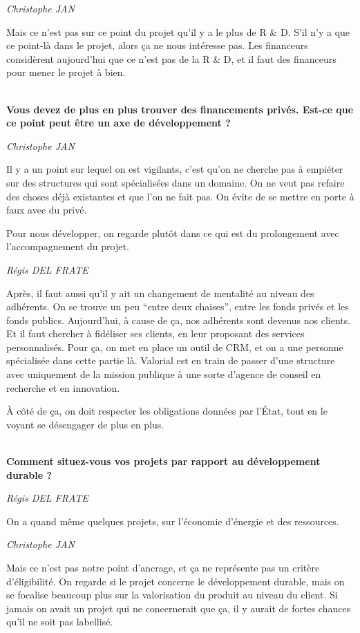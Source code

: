 \documentclass[a4paper,12pt]{report}
\begin{document}
	\emph{Christophe JAN}
	 
    Mais ce n’est pas sur ce point du projet qu’il y a le plus de R \& D. S’il n’y a que ce point-là dans le projet, alors ça ne nous intéresse pas. Les financeurs considèrent aujourd’hui que ce n’est pas de la R \& D, et il faut des financeurs pour mener le projet à bien.

	\textbf{\\Vous devez de plus en plus trouver des financements privés. Est-ce que ce point peut être un axe de développement ?}

	\emph{Christophe JAN}
	
    Il y a un point sur lequel on est vigilants, c’est qu’on ne cherche pas à empiéter sur des structures qui sont spécialisées dans un domaine. On ne veut pas refaire des choses déjà existantes et que l’on ne fait pas. On évite de se mettre en porte à faux avec du privé.
  
    Pour nous développer, on regarde plutôt dans ce qui est du prolongement avec l’accompagnement du projet.

	\emph{Régis DEL FRATE}
    
    Après, il faut aussi qu’il y ait un changement de mentalité au niveau des adhérents. On se trouve un peu “entre deux chaises”, entre les fonds privés et les fonds publics. Aujourd’hui, à cause de ça, nos adhérents sont devenus nos clients. Et il faut chercher à fidéliser ses clients, en leur proposant des services personnalisés. Pour ça, on met en place un outil de CRM, et on a une personne spécialisée dans cette partie là. Valorial est en train de passer d’une structure avec uniquement de la mission publique à une sorte d’agence de conseil en recherche et en innovation.
 
    À côté de ça, on doit respecter les obligations données par l’État, tout en le voyant se désengager de plus en plus. 

	\textbf{\\Comment situez-vous vos projets par rapport au développement durable ?}

	\emph{Régis DEL FRATE}
    
    On a quand même quelques projets, sur l’économie d’énergie et des ressources.

	\emph{Christophe JAN}
	 
    Mais ce n’est pas notre point d’ancrage, et ça ne représente pas un critère d’éligibilité. On regarde si le projet concerne le développement durable, mais on se focalise beaucoup plus sur la valorisation du produit au niveau du client. Si jamais on avait un projet qui ne concernerait que ça, il y aurait de fortes chances qu’il ne soit pas labellisé.
\end{document}
